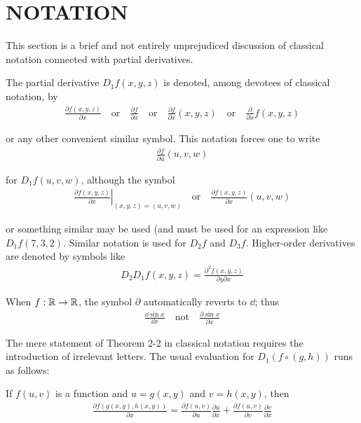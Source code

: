 \clearpage
\section{NOTATION}
This section is a brief and not entirely unprejudiced discussion
of classical notation connected with partial derivatives.

The partial derivative $D_1f(x,y,z)$ is denoted, among devotees
of classical notation, by
\begin{align*}
    \frac{\partial f(x,y,z)}{\partial x}
    \quad\mathrm{or}\quad
    \frac{\partial f}{\partial x}
    \quad\mathrm{or}\quad
    \frac{\partial f}{\partial x}(x,y,z)
    \quad\mathrm{or}\quad
    \frac\partial{\partial x}f(x,y,z)
\end{align*}

or any other convenient similar symbol. This notation forces
one to write
\begin{align}
    \frac{\partial f }{\partial u}(u,v,w)
\end{align}

for $D_1f(u, v, w)$, although the symbol 
\begin{align*}
    \left.\frac{\partial f(x,y,z)}{\partial x}\right|_{(x,y,z)=(u,v,w)}
    \quad\mathrm{or}\quad
    \frac{\partial f(x,y,z)}{\partial x}\left(u,v,w\right)
\end{align*}

or something similar may be used (and must be used for an
expression like $D_1f(7,3,2)$. Similar notation is used for $D_2f$
and $D_3f$. Higher-order derivatives are denoted by symbols
like
\begin{align*}
    D_2D_1f(x,y,z)=\frac{\partial^2f(x,y,z)}{\partial y\partial x}
\end{align*}

When $f:\mathbb{R}\to \mathbb{R}$, the symbol $\partial$ automatically reverts to $\dd$; thus
\begin{align*}
    \frac{\dd\sin x}{\dd x}
    \quad\mathrm{not}\quad
    \frac{\partial\sin x}{\partial x}
\end{align*}

The mere statement of Theorem 2-2 in classical notation
requires the introduction of irrelevant letters. The usual
evaluation for $D_1(f\circ(g, h))$ runs as follows:

If $f(u,v)$ is a function and $u=g(x, y)$ and $v=h(x, y)$, then
\begin{align*}
    \frac{\partial f(g(x,y),h(x,y))}{\partial x}
    =
    \frac{\partial f(u,v)}{\partial u}\frac{\partial u}{\partial x}+\frac{\partial f(u,v)}{\partial v}\frac{\partial v}{\partial x}
\end{align*}

